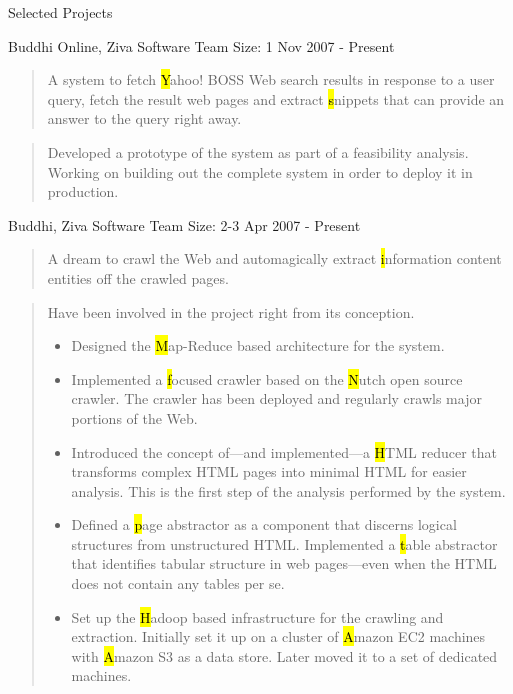 \documentclass{resume}
\newcommand{\teamsize}{\hfill\sc\footnotesize Team Size: }
\begin{document}
\begin{category}{Selected Projects}{}

    \item {\topic Buddhi Online,} Ziva Software
        {\teamsize 1}
        {\period Nov 2007 - Present}
        \begin{quote}
            A system to fetch {\hl Yahoo! BOSS} Web search results in response
            to a user query, fetch the result web pages and extract {\hl
            snippets} that can provide an answer to the query right away.
        \end{quote}
        \begin{quote}
            Developed a prototype of the system as part of a feasibility
            analysis. Working on building out the complete system in order to
            deploy it in production.
        \end{quote}

    \item {\topic Buddhi,} Ziva Software
        {\teamsize 2-3}
        {\period Apr 2007 - Present}
        \begin{quote}
            A dream to crawl the Web and automagically extract {\hl information
            content entities} off the crawled pages.
        \end{quote}
        \begin{quote}
            Have been involved in the project right from its conception.
            \begin{itemize}
                \item Designed the {\hl Map-Reduce} based architecture for the
                    system.
                \item Implemented a {\hl focused crawler} based on the {\hl
                    Nutch} open source crawler. The crawler has been deployed
                    and regularly crawls major portions of the Web.
                \item Introduced the concept of---and implemented---a {\hl
                    HTML reducer} that transforms complex HTML pages into
                    minimal HTML for easier analysis. This is the first step of
                    the analysis performed by the system.
                \item Defined a {\hl page abstractor} as a component that
                    discerns logical structures from unstructured HTML.
                    Implemented a {\hl table abstractor} that identifies
                    tabular structure in web pages---even when the HTML does
                    not contain any tables per se.
                \item Set up the {\hl Hadoop} based infrastructure for the
                    crawling and extraction. Initially set it up on a cluster
                    of {\hl Amazon EC2} machines with {\hl Amazon S3} as a data
                    store. Later moved it to a set of dedicated machines.
            \end{itemize}
        \end{quote}


\end{category}
\end{document}
